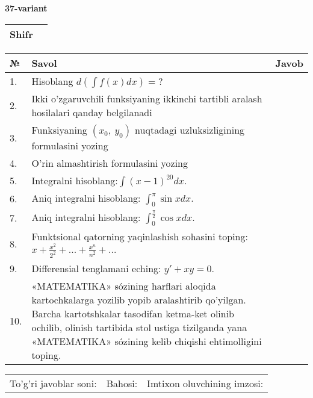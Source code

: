 \documentclass{article}
\begin{document}
  \egroup
  
  \newpage
  
  
  \textbf{37-variant}\\
  
  \bgroup
  \def\arraystretch{1.6} %
  
  \begin{tabular}{|m{5.7cm}|m{9.5cm}|}
  \hline
  Shifr & \\
  \hline
  \end{tabular}
  
  \vspace{1cm}
  
  \begin{tabular}{|m{0.7cm}|m{10cm}|m{4cm}|}
  \hline
  № & Savol & Javob \\
  \hline
  1. & Hisoblang \(d\left( \int {f(x)dx} \right) = ?\) &  \\
  \hline
  2. & Ikki o'zgaruvchili funksiyaning ikkinchi tartibli aralash hosilalari qanday belgilanadi &  \\
  \hline
  3. & Funksiyaning \((x_{0},\ y_{0})\) nuqtadagi uzluksizligining formulasini yozing &  \\
  \hline
  4. & O'rin almashtirish formulasini yozing &  \\
  \hline
  5. & Integralni hisoblang:\(\int {(x - 1)^{20}}dx\). &  \\
  \hline
  6. & Aniq integralni hisoblang: \(\int_{0}^{\pi}{\sin xdx}\). &  \\
  \hline
  7. & Aniq integralni hisoblang: \(\int_{0}^{\frac{\pi}{2}}{\cos xdx}\). &  \\
  \hline
  8. & Funktsional qatorning yaqinlashish sohasini toping: \(x + \frac{x^{2}}{2^{2}} + ... + \frac{x^{n}}{n^{2}} + ...\) &  \\
  \hline
  9. & Differensial tenglamani eching: \(y' + xy = 0\). &  \\
  \hline
  10. & «MATEMATIKA» sózining harflari aloqida kartochkalarga yozilib yopib aralashtirib qo'yilgan. Barcha kartotshkalar tasodifan ketma-ket olinib ochilib, olinish tartibida stol ustiga tizilganda yana «MATEMATIKA» sózining kelib chiqishi ehtimolligini toping. &  \\
  \hline
  \end{tabular}
  
  \vspace{1cm}
  
  \begin{tabular}{lll}
  To'g'ri javoblar soni: \underline{\hspace{1.5cm}} & 
  Bahosi: \underline{\hspace{1.5cm}} & 
  Imtixon oluvchining imzosi: \underline{\hspace{2cm}} \\
  \end{tabular}
  
\end{document}

